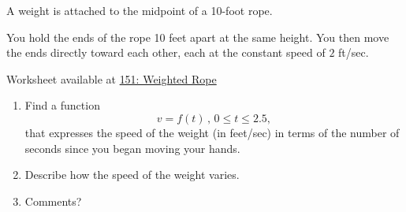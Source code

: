 \documentclass{ximera}
\begin{document}
\begin{exercise} \label{E:KDMTEGE434}
A weight is attached to the midpoint of a 10-foot rope.

You hold the ends of the rope 10 feet apart at the same height. You then move the ends directly toward each other, each at the constant speed of $2$ ft/sec.


\begin{onlineOnly}
    \begin{center}
\end{center}
\end{onlineOnly}

Worksheet available at \href{https://www.desmos.com/calculator/grostrmdln}{151: Weighted Rope}



\begin{enumerate}
\item Find a function 
\[
    v = f(t) \, , \, 0\leq t \leq 2.5 ,
\]
that expresses the speed of the weight (in feet/sec) in terms of the number of seconds since you began moving your hands.

\item Describe how the speed of the weight varies.

\item Comments?

\end{enumerate} 
\end{exercise}
\end{document}
